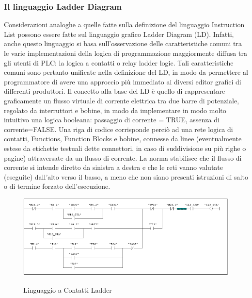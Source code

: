 \documentclass[12pt, a4paper, oneside]{book}
\begin{document}
\subsubsection{Il linguaggio Ladder Diagram}
Considerazioni analoghe a quelle fatte sulla definizione del linguaggio Instruction List possono essere fatte sul linguaggio grafico Ladder Diagram (LD). Infatti, anche questo linguaggio si basa sull'osservazione delle caratteristiche comuni tra le varie implementazioni della logica di programmazione maggiormente diffusa tra gli utenti di PLC: la logica a contatti o relay ladder logic. Tali caratteristiche comuni sono pertanto unificate nella definizione del LD, in modo da permettere al programmatore di avere una approccio più immediato ai diversi editor grafici di differenti produttori. Il concetto alla base del LD è quello di rappresentare graficamente un flusso virtuale di corrente elettrica tra due barre di potenziale, regolato da interruttori e bobine, in modo da implementare in modo molto intuitivo una logica booleana: passaggio di corrente = TRUE, assenza di corrente=FALSE. Una riga di codice corrisponde perciò ad una rete logica di contatti, Functions, Function Blocks e bobine, connesse da linee (eventualmente estese da etichette testuali dette connettori, in caso di suddivisione su più righe o pagine) attraversate da un flusso di corrente. La norma stabilisce che il flusso di corrente si intende diretto da sinistra a destra e che le reti vanno valutate (eseguite) dall'alto
verso il basso, a meno che non siano presenti istruzioni di salto o di termine forzato dell'esecuzione.

	\begin{figure}[H]
	\centering
	\includegraphics[width=12cm]{Immagini/LAD}
	\label{LAD}
	\caption{Linguaggio a Contatti Ladder}
\end{figure}
\end{document}
